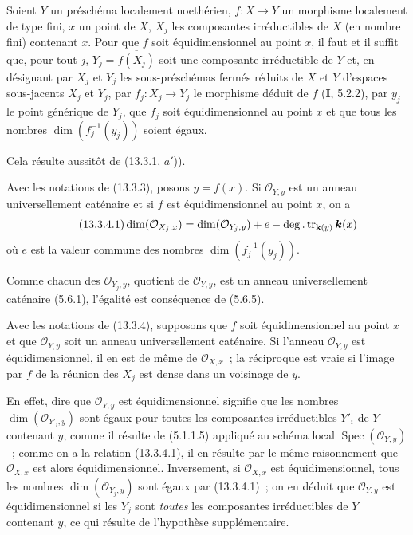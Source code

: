 \begin{proposition}[13.3.3]
\label{IV.13.3.3-fr}
Soient $Y$ un préschéma localement noethérien, $f:X\to Y$ un morphisme
localement de type fini, $x$ un point de $X$, $X_j$ les composantes
irréductibles de $X$ (en nombre fini) contenant $x$. Pour que $f$ soit
équidimensionnel au point $x$, il faut et il suffit que, pour tout $j$,
$Y_j=\overline{f(X_j)}$ soit une composante irréductible de $Y$ et, en
désignant par $X_j$ et $Y_j$ les sous-préschémas fermés réduits de $X$ et $Y$
d'espaces sous-jacents $X_j$ et $Y_j$, par $f_j:X_j\to Y_j$ le morphisme
déduit de $f$ \textup{(\textbf{I}, 5.2.2)}, par $y_j$ le point générique de $Y_j$, que
$f_j$ soit équidimensionnel au point $x$ et que tous les nombres
$\dim(f_j^{-1}(y_j))$ soient égaux.
\end{proposition}

Cela résulte aussitôt de (13.3.1, $a'$)).

\begin{corollary}[13.3.4]
\label{IV.13.3.4-fr}
Avec les notations de \textup{(13.3.3)}, posons $y=f(x)$. Si $\mathcal O_{Y,y}$ est un
anneau universellement caténaire et si $f$ est équidimensionnel au point $x$,
on a
\[
\tag{13.3.4.1}
\label{IV.13.3.4.1-fr}
  \dim(\mathcal O_{X_j,x})=\dim(\mathcal O_{Y_j,y})+e
  -\deg.\operatorname{tr}_{\mathbf{k}(y)}\boldsymbol{k}(x)
\]
où $e$ est la valeur commune des nombres $\dim(f_j^{-1}(y_j))$.
\end{corollary}

Comme chacun des $\mathcal O_{Y_j,y}$, quotient de $\mathcal O_{Y,y}$, est un
anneau universellement caténaire (5.6.1), l'égalité est conséquence de (5.6.5).

\begin{corollary}[13.3.5]
\label{IV.13.3.5-fr}
Avec les notations de \textup{(13.3.4)}, supposons que $f$ soit équidimensionnel au
point $x$ et que $\mathcal O_{Y,y}$ soit un anneau universellement caténaire.
Si l'anneau $\mathcal O_{Y,y}$ est équidimensionnel, il en est de même de
$\mathcal O_{X,x}$~; la réciproque est vraie si l'image par $f$ de la réunion
des $X_j$ est dense dans un voisinage de $y$.
\end{corollary}

En effet, dire que $\mathcal O_{Y,y}$ est équidimensionnel signifie que les
nombres $\dim(\mathcal O_{Y'_i,y})$ sont égaux pour toutes les composantes
irréductibles $Y'_i$ de $Y$ contenant $y$, comme il résulte de (5.1.1.5)
appliqué au schéma local $\operatorname{Spec}(\mathcal O_{Y,y})$~; comme on a
la relation (13.3.4.1), il en résulte par le même raisonnement que
$\mathcal O_{X,x}$ est alors équidimensionnel. Inversement, si
$\mathcal O_{X,x}$ est équidimensionnel, tous les nombres
$\dim(\mathcal O_{Y_j,y})$ sont égaux par (13.3.4.1)~; on en déduit que
$\mathcal O_{Y,y}$ est équidimensionnel si les $Y_j$ sont \emph{toutes} les
composantes irréductibles de $Y$ contenant $y$, ce qui résulte de l'hypothèse
supplémentaire.

